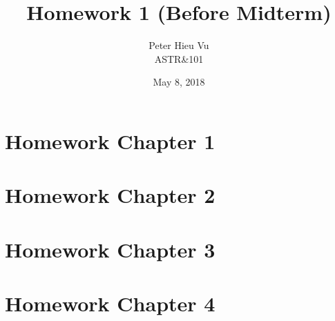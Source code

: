 \documentclass[12pt]{article}
\title{\vspace{-1.5cm}Homework 1 (Before Midterm)}
\author{Peter Hieu Vu\\ASTR\&101}
\date{May 8, 2018}
\newcommand\onlyinsubfile[1]{#1}
\newcommand\notinsubfile[1]{}
\begin{document}
    \renewcommand{\onlyinsubfile}[1]{}
    \renewcommand{\notinsubfile}[1]{#1}

    \maketitle

    \section{Homework Chapter 1}
        

    \newpage
    \section{Homework Chapter 2}
        

    \newpage
    \section{Homework Chapter 3}
        

    \newpage
    \section{Homework Chapter 4}
        
\end{document}
